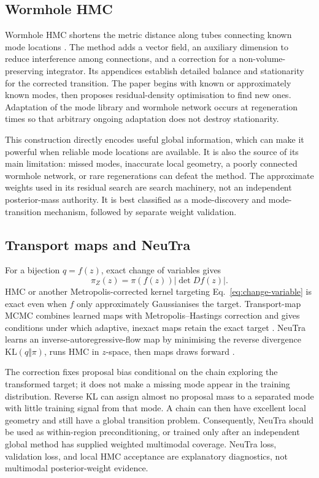 \documentclass[11pt]{article}
\begin{document}
\subsection{Wormhole HMC}

Wormhole HMC shortens the metric distance along tubes connecting known mode
locations \citep{lan2014wormhole}.  The method adds a vector field, an auxiliary
dimension to reduce interference among connections, and a correction for a
non-volume-preserving integrator.  Its appendices establish detailed balance and
stationarity for the corrected transition.  The paper begins with known or
approximately known modes, then proposes residual-density optimisation to find new
ones.  Adaptation of the mode library and wormhole network occurs at regeneration
times so that arbitrary ongoing adaptation does not destroy stationarity.

This construction directly encodes useful global information, which can make it
powerful when reliable mode locations are available.  It is also the source of its
main limitation: missed modes, inaccurate local geometry, a poorly connected
wormhole network, or rare regenerations can defeat the method.  The approximate
weights used in its residual search are search machinery, not an independent
posterior-mass authority.  It is best classified as a mode-discovery and
mode-transition mechanism, followed by separate weight validation.

\subsection{Transport maps and NeuTra}

For a bijection $q=f(z)$, exact change of variables gives
\begin{equation}
  \pi_Z(z)=\pi(f(z))\left|\det Df(z)\right|.
  \label{eq:change-variable}
\end{equation}
HMC or another Metropolis-corrected kernel targeting Eq.~\eqref{eq:change-variable}
is exact even when $f$ only approximately Gaussianises the target.  Transport-map
MCMC combines learned maps with Metropolis--Hastings correction and gives conditions
under which adaptive, inexact maps retain the exact target
\citep{parno2018transport}.  NeuTra learns an inverse-autoregressive-flow map by
minimising the reverse divergence $\mathrm{KL}(q\Vert\pi)$, runs HMC in $z$-space,
then maps draws forward \citep{hoffman2019neutra}.

The correction fixes proposal bias conditional on the chain exploring the transformed
target; it does not make a missing mode appear in the training distribution.  Reverse
KL can assign almost no proposal mass to a separated mode with little training signal
from that mode.  A chain can then have excellent local geometry and still have a
global transition problem.  Consequently, NeuTra should be used as within-region
preconditioning, or trained only after an independent global method has supplied
weighted multimodal coverage.  NeuTra loss, validation loss, and local HMC
acceptance are explanatory diagnostics, not multimodal posterior-weight evidence.
\end{document}
